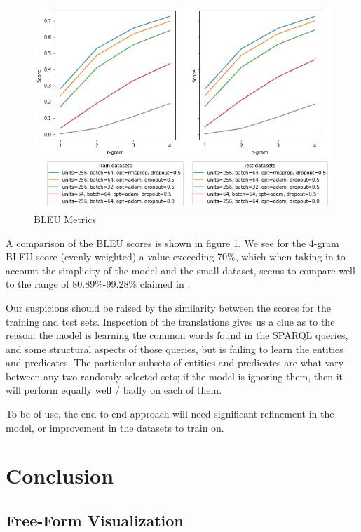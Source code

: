 \documentclass[12pt]{article}
\begin{document}
\begin{figure}
  \centering
  \includegraphics[width=14cm]{images/bleu_metrics.png}
  \caption{BLEU Metrics}
  \label{fig:bleu-metrics}
\end{figure}

A comparison of the BLEU scores is shown in figure \ref{fig:bleu-metrics}.
We see for the 4-gram BLEU score (evenly weighted) a value exceeding 70\%, 
which when taking in to account the simplicity of the model and the small
dataset, seems to compare well to the range of 80.89\%-99.28\% claimed in
\cite{soru2018neural}.

Our suspicions should be raised by the similarity between the scores
for the training and test sets. Inspection of the translations gives us
a clue as to the reason: the model is learning the common words found in
the SPARQL queries, and some structural aspects of those queries, but is
failing to learn the entities and predicates. The particular subsets of 
entities and predicates are what vary between any two randomly selected
sets; if the model is ignoring them, then it will perform equally well / 
badly on each of them.

To be of use, the end-to-end approach will need significant refinement in
the model, or improvement in the datasets to train on.

\section{Conclusion}\label{v.-conclusion}

\subsection{Free-Form Visualization}\label{free-form-visualization}
\end{document}
